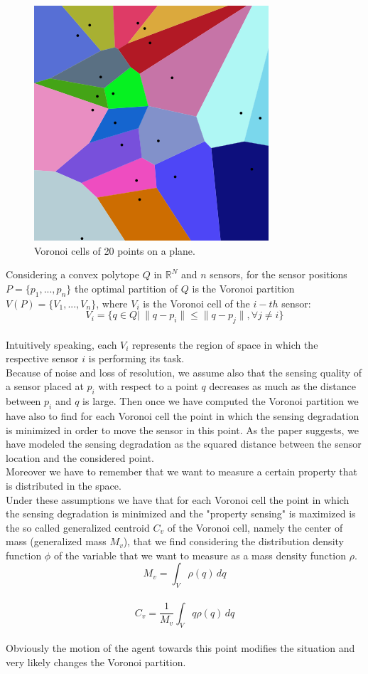 \documentclass[a4paper,11pt,oneside]{book}
\begin{document}
	\begin{figure}[hb]
		
		\centering
		
		\includegraphics[scale=0.33]{figs/VoronoiPartition.png}
		\caption{Voronoi cells of 20 points on a plane.}\label{fig:Voronoi Partition.png}	
	\end{figure}
	
\newpage %
	Considering a convex polytope $Q$ in $\mathbb{R}^N$ and $n$ sensors, for the sensor positions $P=\{p_1,...,p_n\}$ the optimal partition of $Q$ is the Voronoi partition  $V(P)=\{V_1,...,V_n\}$, where $V_i$ is the Voronoi cell of the $i-th$ sensor: $$V_i=\{q\in Q|\> \|q-p_i\|\le\|q-p_j\|, \forall j\not= i\}$$\\
	Intuitively speaking, each $V_i$ represents the region of space in which the respective sensor $i$ is performing its task.\\
	
	
	Because of noise and loss of resolution, we assume also that the sensing quality of a sensor placed at $p_i$ with respect to a point $q$ decreases as much as the distance between $p_i$ and $q$ is large. Then once we have computed the Voronoi partition we have also to find for each Voronoi cell the point in which the sensing degradation is minimized in order to move the sensor in this point. As the paper suggests, we have modeled the sensing degradation as the squared distance between the sensor location and the considered point.\\
	Moreover we have to remember that we want to measure a certain property that is distributed in the space.\\
	Under these assumptions we have that for each Voronoi cell the point in which the sensing degradation is minimized and the "property sensing" is maximized is the so called generalized centroid $C_v$ of the Voronoi cell, namely the center of mass (generalized mass $M_v$), that we find considering the distribution density function $\phi$ of the variable that we want to measure as a mass density function $\rho$.\\
	$$M_v=\int_{V} \rho(q)\, dq$$  \\ 
	$$C_v=\frac{1}{M_v} \int_{V} q \rho(q)\, dq$$  \\
	Obviously the motion of the agent towards this point modifies the situation and very likely changes the Voronoi partition.\\
	
\end{document}
